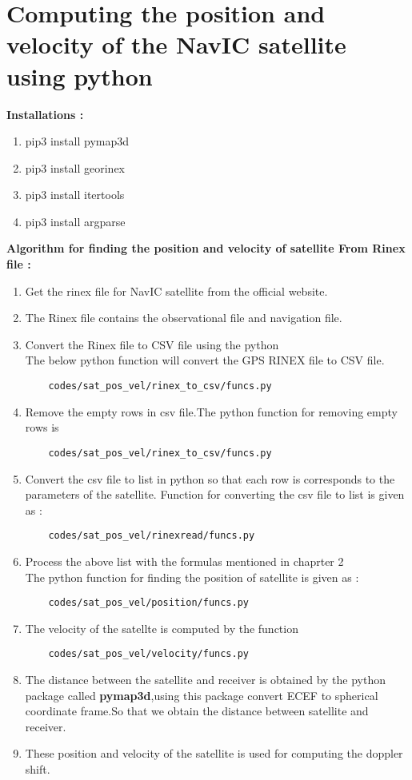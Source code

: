 \section{Computing the position and velocity of the  NavIC satellite using python}
\textbf{Installations :}
\begin{enumerate}
\item pip3 install pymap3d
\item pip3 install georinex
\item pip3 install itertools
\item pip3 install argparse
\end{enumerate}
\textbf{Algorithm for finding the position and velocity of satellite From Rinex file :}
\begin{enumerate}
  \item Get the rinex file for NavIC satellite from the official website.
  \item The Rinex file contains the observational file and navigation file.
  \item Convert the Rinex file to CSV file using the python \\
  The below python function will convert the GPS RINEX file to CSV file.
  \begin{lstlisting}
    codes/sat_pos_vel/rinex_to_csv/funcs.py
  \end{lstlisting}
  \item Remove the empty rows in csv file.The python function for removing empty rows is 
  \begin{lstlisting}
    codes/sat_pos_vel/rinex_to_csv/funcs.py
  \end{lstlisting}
  \item Convert the csv file to list in python so that each row is corresponds to the parameters of the satellite. Function for converting the csv file to list is given as :
  \begin{lstlisting}
    codes/sat_pos_vel/rinexread/funcs.py
  \end{lstlisting} 
  \item Process the above list with the formulas mentioned in chaprter 2 \\
  The python function for finding the position of satellite is given as :
  \begin{lstlisting}
    codes/sat_pos_vel/position/funcs.py
  \end{lstlisting}
  \item The velocity of the satellte is computed by the function 
  \begin{lstlisting}
    codes/sat_pos_vel/velocity/funcs.py
  \end{lstlisting}
  \item The distance between the satellite and receiver is obtained by the python package called \textbf{pymap3d},using this package convert ECEF to spherical coordinate frame.So that we obtain the distance between satellite and receiver.
  \item These position and velocity of the satellite is used for computing the doppler shift.
\end{enumerate}
